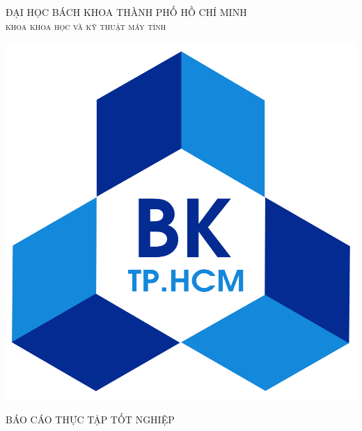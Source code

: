 \documentclass[12pt,a4paper]{article}
\begin{document}
\begin{titlepage}

\newcommand{\HRule}{\rule{\linewidth}{0.5mm}} %
\newcommand\tab[1][1cm]{\hspace*{#1}}

\center %
 

\textsc{\large ĐẠI HỌC BÁCH KHOA THÀNH PHỐ HỒ CHÍ MINH}\\[0.2cm] %
\textsc{\Large \scshape khoa khoa học và kỹ thuật máy tính}\\[0.5cm] %
\begin{center}
    \includegraphics[scale=.14]{image/logo}
\end{center}

\textsc{\large BÁO CÁO THỰC TẬP TỐT NGHIỆP}\\[0.2cm] %



\end{titlepage}
\end{document}
